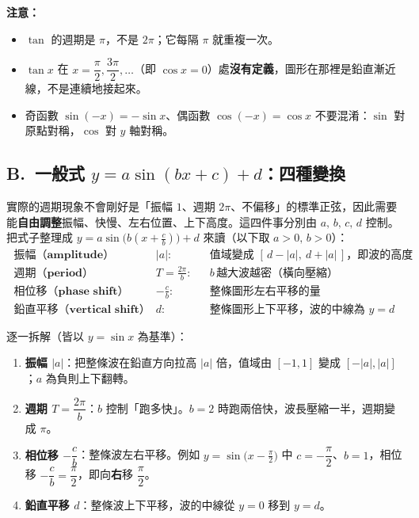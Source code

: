 \documentclass[11pt]{article}
\begin{document}
\textbf{注意：}
\begin{itemize}\setlength{\itemsep}{1pt}
\item $\tan$ 的週期是 $\pi$，不是 $2\pi$；它每隔 $\pi$ 就重複一次。
\item $\tan x$ 在 $x=\dfrac{\pi}{2},\dfrac{3\pi}{2},\dots$（即 $\cos x=0$）處\textbf{沒有定義}，圖形在那裡是鉛直漸近線，不是連續地接起來。
\item 奇函數 $\sin(-x)=-\sin x$、偶函數 $\cos(-x)=\cos x$ 不要混淆：$\sin$ 對原點對稱，$\cos$ 對 $y$ 軸對稱。
\end{itemize}

\subsection*{\sffamily B.\ 一般式 $y=a\sin(bx+c)+d$：四種變換}

實際的週期現象不會剛好是「振幅 $1$、週期 $2\pi$、不偏移」的標準正弦，因此需要能\textbf{自由調整}振幅、快慢、左右位置、上下高度。這四件事分別由 $a,\,b,\,c,\,d$ 控制。把式子整理成 $y=a\sin\!\big(b(x+\tfrac{c}{b})\big)+d$ 來讀（以下取 $a>0,\,b>0$）：
$$\boxed{\;
\begin{aligned}
\textbf{振幅（amplitude）}\ &|a|: && \text{值域變成 } [\,d-|a|,\ d+|a|\,]\text{，即波的高度} \\
\textbf{週期（period）}\ &T=\frac{2\pi}{b}: && b\,\text{越大波越密（橫向壓縮）} \\
\textbf{相位移（phase shift）}\ &-\frac{c}{b}: && \text{整條圖形左右平移的量} \\
\textbf{鉛直平移（vertical shift）}\ &d: && \text{整條圖形上下平移，波的中線為 } y=d
\end{aligned}
\;}$$


逐一拆解（皆以 $y=\sin x$ 為基準）：

\begin{enumerate}\setlength{\itemsep}{2pt}
\item \textbf{振幅 $|a|$}：把整條波在鉛直方向拉高 $|a|$ 倍，值域由 $[-1,1]$ 變成 $[-|a|,|a|]$；$a$ 為負則上下翻轉。
\item \textbf{週期 $T=\dfrac{2\pi}{b}$}：$b$ 控制「跑多快」。$b=2$ 時跑兩倍快，波長壓縮一半，週期變成 $\pi$。
\item \textbf{相位移 $-\dfrac{c}{b}$}：整條波左右平移。例如 $y=\sin\!\big(x-\tfrac{\pi}{2}\big)$ 中 $c=-\dfrac{\pi}{2}$、$b=1$，相位移 $-\dfrac{c}{b}=\dfrac{\pi}{2}$，即向\textbf{右}移 $\dfrac{\pi}{2}$。
\item \textbf{鉛直平移 $d$}：整條波上下平移，波的中線從 $y=0$ 移到 $y=d$。
\end{enumerate}
\end{document}

